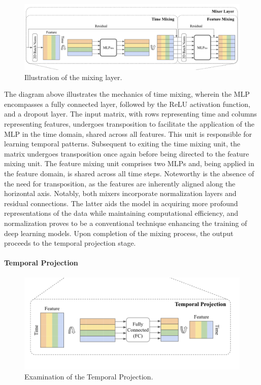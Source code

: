 \begin{figure}
    \centering
    \includegraphics[width=1\linewidth]{images/model architectures/Mixing layer.png}
    \caption{Illustration of the mixing layer. \cite{chen2023tsmixer}}
    \label{fig:tsmixer-mixing-layer}
\end{figure}

The diagram above illustrates the mechanics of time mixing, wherein the MLP encompasses a fully connected layer, followed by the ReLU activation function, and a dropout layer. The input matrix, with rows representing time and columns representing features, undergoes transposition to facilitate the application of the MLP in the time domain, shared across all features. This unit is responsible for learning temporal patterns. Subsequent to exiting the time mixing unit, the matrix undergoes transposition once again before being directed to the feature mixing unit. The feature mixing unit comprises two MLPs and, being applied in the feature domain, is shared across all time steps. Noteworthy is the absence of the need for transposition, as the features are inherently aligned along the horizontal axis. Notably, both mixers incorporate normalization layers and residual connections. The latter aids the model in acquiring more profound representations of the data while maintaining computational efficiency, and normalization proves to be a conventional technique enhancing the training of deep learning models. Upon completion of the mixing process, the output proceeds to the temporal projection stage.

\paragraph{Temporal Projection}

\begin{figure}
    \centering
    \includegraphics[width=1\linewidth]{images/model architectures/temporalprojection.png}
    \caption{Examination of the Temporal Projection. \cite{chen2023tsmixer}}
    \label{fig:enter-label}
\end{figure}

